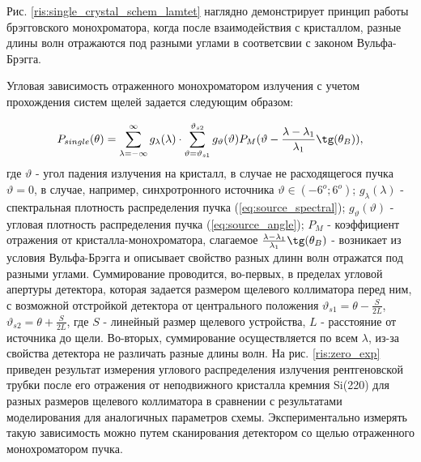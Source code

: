 Рис. \ref{ris:single_crystal_schem_lamtet} наглядно демонстрирует принцип работы
брэгговского монохроматора, когда после взаимодействия с кристаллом, разные
длины волн отражаются под разными углами в соответсвии с законом Вульфа-Брэгга.

Угловая зависимость отраженного монохроматором излучения с учетом прохождения
систем щелей задается следующим образом:

\begin{equation} \label{eq:p_single_crystal}
  P_{single}(\theta) = \sum_{\lambda = -\infty}^{\infty}g_{\lambda}(\lambda) \cdot \sum_{\vartheta = \vartheta_{s1}}^{\vartheta_{s2}}
  g_{\vartheta}(\vartheta) P_M(\vartheta - \frac{\lambda - \lambda_1}{\lambda_1}\tg(\theta_B)),
 \end{equation}
\noindent
где $\vartheta$ - угол падения излучения на кристалл, в случае не расходящегося пучка $\vartheta = 0$, в
случае, например, синхротронного источника $\vartheta \in (-6^o; 6^o) $; $g_{\lambda}(\lambda)$
- спектральная плотность распределения пучка (\ref{eq:source_spectral}); $g_{\vartheta}(\vartheta)$ - угловая плотность
распределения пучка (\ref{eq:source_angle}); $P_M$ - коэффициент отражения от кристалла-монохроматора,
слагаемое $\frac{\lambda - \lambda_1}{\lambda_1}\tg(\theta_B)$ - возникает из
условия Вульфа-Брэгга и описывает свойство разных длинн волн отражатся под разными углами.
 Суммирование проводится, во-первых, в пределах угловой апертуры детектора, которая задается размером
 щелевого коллиматора перед ним, с возможной отстройкой детектора от центрального положения
  $\vartheta_{s1} = \theta - \frac{S}{2L}$, $\vartheta_{s2} = \theta + \frac{S}{2L}$, где
   $S $ - линейный размер щелевого устройства, $L$ - расстояние от источника до щели.
 Во-вторых, суммирование осуществляется по всем $\lambda$, из-за свойства детектора не различать разные длины волн.
На рис. \ref{ris:zero_exp} приведен результат измерения углового распределения излучения рентгеновской трубки
после его отражения от неподвижного кристалла кремния Si(220) для разных размеров щелевого коллиматора
в сравнении с результатами моделирования для аналогичных параметров схемы.
Экспериментально измерять такую зависимость можно путем сканирования
детектором со щелью отраженного монохроматором пучка.
